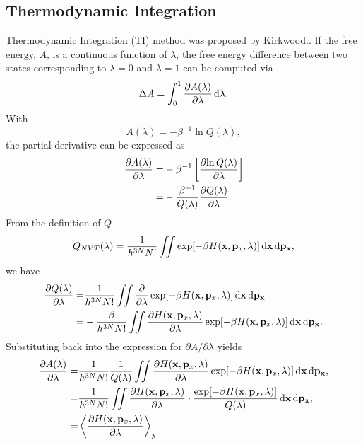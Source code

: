 \subsection{Thermodynamic Integration\label{Sec:FEM:TI}}
Thermodynamic Integration (TI) method was proposed by Kirkwood.\cite{KirkwoodJCP1935}. If the free energy, $A$, is a continuous function of $\lambda$, the free energy difference between two states corresponding to $\lambda=0$ and $\lambda=1$ can be computed via
\begin{equation}
\Delta A = \int_{0}^{1} \frac{\partial{A(\lambda)}}{\partial{\lambda}} \mathop{}\!\mathrm{d}\lambda.
\label{Eq:FEM:TI:deltaA1TI}
\end{equation} 
With
\begin{equation}
A(\lambda) = -\beta^{-1}\ln Q(\lambda),
\label{Eq:FEM:TI:Alambda}
\end{equation} 
the partial derivative can be expressed as
\begin{align}
\frac{\partial{A(\lambda)}}{\partial{\lambda}} =& -\beta^{-1} \left[ \frac{\partial{\ln{Q(\lambda)}}}{\partial{\lambda}} \right] \notag\\
=&-\frac{\beta^{-1}}{Q(\lambda)}\frac{\partial{Q(\lambda)}}{\partial{\lambda}}.
\label{Eq:FEM:TI:deltaA2TI}
\end{align} 
From the definition of $Q$
\begin{equation}
Q_{NVT}(\lambda) = \frac{1}{{h}^{3N}N!} \iint \exp[-\beta H(\mathbf{x},\mathbf{p}_{x},\lambda)] \mathop{}\!\mathrm{d}\mathbf{x}\mathop{}\!\mathrm{d}\mathbf{p}_\mathbf{x},
\label{Eq:FEM:TI:PFTI}
\end{equation}
we have
\begin{align}
\frac{\partial{Q(\lambda)}}{\partial{\lambda}} =&\frac{1}{{h}^{3N}N!} \iint \frac{\partial}{\partial{\lambda}}\exp[-\beta H(\mathbf{x},\mathbf{p}_{x},\lambda)] \mathop{}\!\mathrm{d}\mathbf{x}\mathop{}\!\mathrm{d}\mathbf{p}_\mathbf{x}\notag\\
=& -\frac{\beta}{{h}^{3N}N!} \iint \frac{\partial{H(\mathbf{x},\mathbf{p}_{x},\lambda)}}{\partial{\lambda}}\exp[-\beta H(\mathbf{x},\mathbf{p}_{x},\lambda)] \mathop{}\!\mathrm{d}\mathbf{x}\mathop{}\!\mathrm{d}\mathbf{p}_\mathbf{x}.
\label{Eq:FEM:TI:PPF2}
\end{align}
Substituting back into the expression for $\partial{A}/\partial{\lambda}$ yields
\begin{align}
\frac{\partial{A(\lambda)}}{\partial{\lambda}} =& \frac{1}{{h}^{3N}N!}\frac{1}{Q(\lambda)} \iint \frac{\partial{H(\mathbf{x},\mathbf{p}_{x},\lambda)}}{\partial{\lambda}}\exp[-\beta H(\mathbf{x},\mathbf{p}_{x},\lambda)] \mathop{}\!\mathrm{d}\mathbf{x}\mathop{}\!\mathrm{d}\mathbf{p}_\mathbf{x}, \notag\\
=& \frac{1}{{h}^{3N}N!}\iint \frac{\partial{H(\mathbf{x},\mathbf{p}_{x},\lambda)}}{\partial{\lambda}}\cdot\frac{\exp[-\beta H(\mathbf{x},\mathbf{p}_{x},\lambda)]}{Q(\lambda)} \mathop{}\!\mathrm{d}\mathbf{x}\mathop{}\!\mathrm{d}\mathbf{p}_\mathbf{x},\notag \\
=& \left \langle \frac{\partial{H(\mathbf{x},\mathbf{p}_{x}, \lambda)}}{\partial{\lambda}} \right \rangle_{\lambda}
\label{Eq:FEM:TI:PA2}
\end{align}
